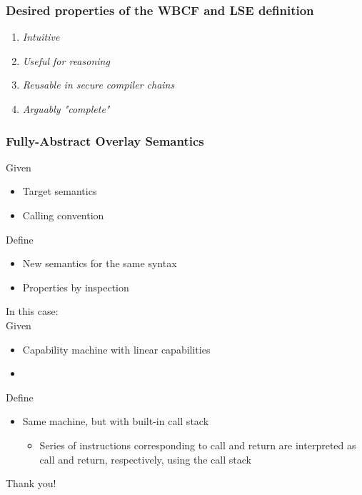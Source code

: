 \documentclass[aspectratio=169]{beamer}
\begin{document}
\begin{frame}
  \frametitle{Desired properties of the WBCF and LSE definition}
  \begin{enumerate}
\item {\itshape Intuitive}%
\item {\itshape Useful for reasoning}%
\item {\itshape Reusable in secure compiler chains}%
\item {\itshape Arguably "complete"}%
\end{enumerate}
\end{frame}

\begin{frame}
  \frametitle{Fully-Abstract Overlay Semantics}
  Given
  \begin{itemize}
  \item Target semantics
  \item Calling convention
  \end{itemize}
  Define
  \begin{itemize}
  \item New semantics for the same syntax
  \item Properties by inspection
  \end{itemize}
  In this case:\\
  Given
  \begin{itemize}
  \item Capability machine with linear capabilities
  \item \stktokens{} 
  \end{itemize}
  Define
  \begin{itemize}
  \item Same machine, but with built-in call stack
    \begin{itemize}
    \item Series of instructions corresponding to call and return are
      interpreted as call and return, respectively, using the call stack
    \end{itemize}
  \end{itemize}
\end{frame}

\begin{frame}
  \centering
  Thank you!
\end{frame}
\end{document}
